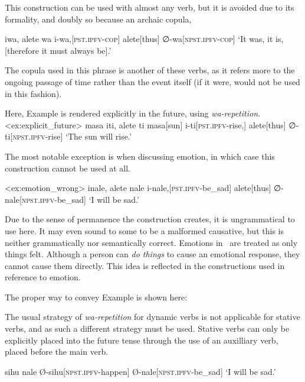 This construction can be used with almost any verb, but it is avoided due to its formality, and doubly so because an archaic copula, 

\ex
\begingl
\glpreamble iwa, alete wa
\endpreamble
i-wa,[\textsc{pst.ipfv-cop}]
alete[thus]
∅-wa[\textsc{npst.ipfv-cop}]
\glft `It was, it is, [therefore it must always be].'
\endgl
\xe

The copula used in this phrase is another of these verbs, as it refers more to the ongoing passage of time rather than the event itself (if it were,  would not be used in this fashion).

Here, Example  is rendered explicitly in the future, using \textit{wa-repetition.}
\ex<ex:explicit_future>
\begingl
\glpreamble masa iti, alete ti
\endpreamble
masa[sun]
i-ti[\textsc{pst.ipfv-}rise,]
alete[thus]
∅-ti[\textsc{npst.ipfv-}rise]
\glft `The sun will rise.'
\endgl
\xe

The most notable exception is when discussing emotion, in which case this construction cannot be used at all.

\ex<ex:emotion_wrong>
\begingl
\glpreamble \ljudge{*} inale, alete nale
\endpreamble
i-nale,[\textsc{pst.ipfv-}be\_sad]
alete[thus]
∅-nale[\textsc{npst.ipfv-}be\_sad]
\glft `I will be sad.'
\endgl
\xe

Due to the sense of permanence the construction creates, it is ungrammatical to use here.
It may even sound to some to be a malformed causative, but this is neither grammatically nor semantically correct.
Emotions in \langname\ are treated as only things felt.
Although a person can \textit{do things} to cause an emotional response, they cannot cause them directly.
This idea is reflected in the constructions used in reference to emotion.

The proper way to convey Example  is shown here:

The usual strategy of \textit{wa-repetition} for dynamic verbs is not applicable for stative verbs, and as such a different strategy must be used.
Stative verbs can only be explicitly placed into the future tense through the use of an auxilliary verb,  placed before the main verb.

\ex
\begingl
\glpreamble sihu nale
\endpreamble
Ø-sihu[\textsc{npst.ipfv-}happen]
Ø-nale[\textsc{npst.ipfv-}be\_sad]
\glft `I will be sad.'
\endgl
\xe

